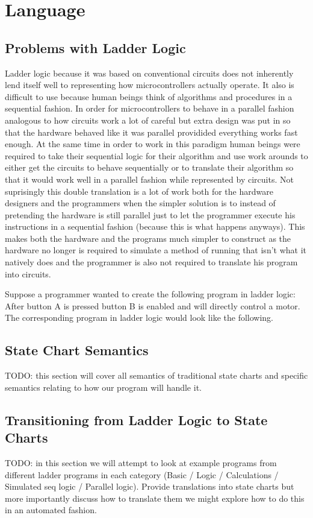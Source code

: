 \chapter{Language}
\section{Problems with Ladder Logic}
Ladder logic because it was based on conventional circuits does not inherently lend itself well to representing how microcontrollers actually operate. It also is difficult to use because human beings think of algorithms and procedures in a sequential fashion. In order for microcontrollers to behave in a parallel fashion analogous to how circuits work a lot of careful but extra design was put in so that the hardware behaved like it was parallel providided everything works fast enough. At the same time in order to work in this paradigm human beings were required to take their sequential logic for their algorithm and use work arounds to either get the circuits to behave sequentially or to translate their algorithm so that it would work well in a parallel fashion while represented by circuits. Not suprisingly this double translation is a lot of work both for the hardware designers and the programmers when the simpler solution is to instead of pretending the hardware is still parallel just to let the programmer execute his instructions in a sequential fashion (because this is what happens anyways). This makes both the hardware and the programs much simpler to construct as the hardware no longer is required to simulate a method of running that isn't what it natively does and the programmer is also not required to translate his program into circuits.

Suppose a programmer wanted to create the following program in ladder logic: After button A is pressed button B is enabled and will directly control a motor. The corresponding program in ladder logic would look like the following.


\section{State Chart Semantics}\label{sec:lang:statesemantics}
TODO: this section will cover all semantics of traditional state charts and specific semantics relating to how our program will handle it.
\section{Transitioning from Ladder Logic to State Charts}
TODO: in this section we will attempt to look at example programs from different ladder programs in each category (Basic / Logic / Calculations / Simulated seq logic / Parallel logic). Provide translations into state charts but more importantly discuss how to translate them we might explore how to do this in an automated fashion.
